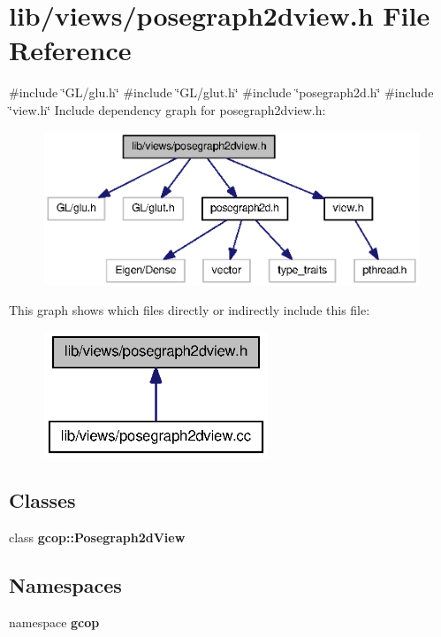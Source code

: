 \section{lib/views/posegraph2dview.h \-File \-Reference}
\label{posegraph2dview_8h}
{\ttfamily \#include \char`\"{}\-G\-L/glu.\-h\char`\"{}}\*
{\ttfamily \#include \char`\"{}\-G\-L/glut.\-h\char`\"{}}\*
{\ttfamily \#include \char`\"{}posegraph2d.\-h\char`\"{}}\*
{\ttfamily \#include \char`\"{}view.\-h\char`\"{}}\*
\-Include dependency graph for posegraph2dview.\-h\-:
\nopagebreak
\begin{figure}[H]
\begin{center}
\leavevmode
\includegraphics[width=350pt]{posegraph2dview_8h__incl}
\end{center}
\end{figure}
\-This graph shows which files directly or indirectly include this file\-:
\nopagebreak
\begin{figure}[H]
\begin{center}
\leavevmode
\includegraphics[width=190pt]{posegraph2dview_8h__dep__incl}
\end{center}
\end{figure}
\subsection*{\-Classes}
\begin{DoxyCompactItemize}
\item 
class {\bf gcop\-::\-Posegraph2d\-View}
\end{DoxyCompactItemize}
\subsection*{\-Namespaces}
\begin{DoxyCompactItemize}
\item 
namespace {\bf gcop}
\end{DoxyCompactItemize}
